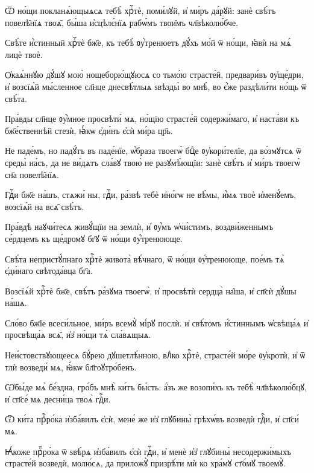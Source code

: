 \hKv Ѿ но́щи покланѧ́ющыѧсѧ тебѣ̀ хрⷭ҇тѐ, поми́лꙋй, и҆ ми́ръ  да́рꙋй: занѐ свѣ́тъ повелѣ̑нїѧ твоѧ̑, бы́ша и҆сцѣлє́нїѧ  рабѡ́мъ твои̑мъ чл҃вѣколю́бче. 

\hKv Свѣ́те и҆́стинный хрⷭ҇тѐ бж҃е, къ тебѣ̀ ᲂу҆́тренюетъ  дꙋ́хъ мо́й ѿ но́щи, ꙗ҆вѝ на мѧ̀ лицѐ твоѐ. 

\hKv Ѻ҆каѧ́ннꙋю дꙋ́шꙋ мою̀ нощеборю́щꙋюсѧ со тьмо́ю страсте́й,  предвари́въ ᲂу҆ще́дри, и҆ возсїѧ́й мы́сленное сл҃нце  днесвѣ́тлыѧ ѕвѣзды̀ во мнѣ̀, во є҆́же раздѣли́ти но́щь  ѿ свѣ́та. 

\hKv Пра́вды сл҃нце ᲂу҆́мное просвѣти́ мѧ, но́щїю страсте́й  содержи́маго, и҆ наста́ви къ бж҃е́ственнѣй стезѝ, ꙗ҆́кѡ  є҆ди́нъ є҆сѝ ми́ра цр҃ь. 

\hKv Не паде́мъ, но падꙋ́тъ въ паде́нїе, ѡ҆́браза твоегѡ̀ бцⷣе  ᲂу҆кори́телїе, да во́змꙋтсѧ ѿ среды̀ на́съ, да не ви́дѧтъ  сла́вꙋ твою̀ не разꙋмѣ́ющїи: занѐ свѣ́тъ и҆ ми́ръ твоегѡ̀  сн҃а повелѣ̑нїѧ.  

\hKv Гдⷭ҇и бж҃е на́шъ, стѧжи́ ны, гдⷭ҇и, ра́звѣ тебѐ и҆но́гѡ не  вѣ́мы, и҆́мѧ твоѐ и҆менꙋ́емъ, возсїѧ́й на всѧ̑ свѣ́тъ. 

\hKv Пра́вдѣ наꙋчи́тесѧ живꙋ́щїи на землѝ, и҆ ᲂу҆́мъ  ѡ҆чи́стимъ, воздви́женнымъ се́рдцемъ къ ще́дромꙋ бг҃ꙋ ѿ  но́щи ᲂу҆́тренююще. 

\hKv Свѣ́та непристꙋ́пнаго хрⷭ҇тѐ живота̀ вѣ́чнаго, ѿ но́щи  ᲂу҆́тренююще, пое́мъ тѧ̀ є҆ди́наго свѣтода́вца бг҃а. 

\hKv Возсїѧ́й хрⷭ҇тѐ бж҃е, свѣ́тъ ра́зꙋма твоегѡ̀, и҆  просвѣтѝ сердца̀ на̑ша, и҆ сп҃сѝ дꙋ́шы на́шѧ. 

\hKv Сло́во бж҃їе всеси́льное, ми́ръ всемꙋ̀ мі́рꙋ послѝ. и҆  свѣ́томъ и҆́стиннымъ ѡ҆свѣща́ѧ и҆ просвѣща́ѧ всѧ̑, и҆з̾  но́щи тѧ̀ сла́вѧщыѧ. 
%

\hKv Неи́стовствꙋющеесѧ бꙋ́рею дꙋшетлѣ́нною, влⷣко хрⷭ҇тѐ,  страсте́й мо́ре ᲂу҆кротѝ, и҆ ѿ тлѝ возведи́ мѧ, ꙗ҆́кѡ  бл҃гоꙋтро́бенъ.  
%

\hKv Ѡ҆бы́де мѧ̀ бе́здна, гро́бъ мнѣ̀ ки́тъ  бы́сть: а҆́зъ же возопи́хъ къ тебѣ̀ чл҃вѣколю́бцꙋ, и҆  сп҃се́ мѧ десни́ца твоѧ̀ гдⷭ҇и. 
%

\hKv Ѿ ки́та прⷪ҇ро́ка и҆зба́вилъ є҆сѝ, мене́ же и҆з̾  глꙋбины̀ грѣхѡ́въ возведѝ гдⷭ҇и, и҆ сп҃си́ мѧ. 

\hKv Ꙗ҆́коже прⷪ҇ро́ка ѿ ѕвѣ́рѧ и҆зба́вилъ є҆сѝ гдⷭ҇и, и҆  менѐ и҆з̾ глꙋбины̀ несодержи́мыхъ страсте́й возведѝ,  молю́сѧ, да приложꙋ̀ призрѣ́ти мѝ ко хра́мꙋ ст҃о́мꙋ  твоемꙋ̀. 

